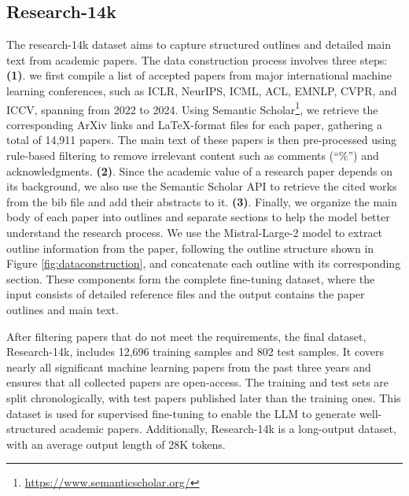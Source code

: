 \documentclass{article} %
\begin{document}
\subsection{Research-14k}

The research-14k dataset aims to capture structured outlines and detailed main text from academic papers. The data construction process involves three steps: \textbf{(1)}. we first compile a list of accepted papers from major international machine learning conferences, such as ICLR, NeurIPS, ICML, ACL, EMNLP, CVPR, and ICCV, spanning from 2022 to 2024. Using Semantic Scholar\footnote{\url{https://www.semanticscholar.org/}}, we retrieve the corresponding ArXiv links and LaTeX-format files for each paper, gathering a total of 14,911 papers. The main text of these papers is then pre-processed using rule-based filtering to remove irrelevant content such as comments (``$\%$'') and acknowledgments. \textbf{(2)}. Since the academic value of a research paper depends on its background, we also use the Semantic Scholar API to retrieve the cited works from the bib file and add their abstracts to it. \textbf{(3)}. Finally, we organize the main body of each paper into outlines and separate sections to help the model better understand the research process. We use the Mistral-Large-2 model \citep{jiang2023mistral} to extract outline information from the paper, following the outline structure shown in Figure \ref{fig:dataconstruction}, and concatenate each outline with its corresponding section. These components form the complete fine-tuning dataset, where the input consists of detailed reference files and the output contains the paper outlines and main text.


After filtering papers that do not meet the requirements, the final dataset, Research-14k, includes 12,696 training samples and 802 test samples. It covers nearly all significant machine learning papers from the past three years and ensures that all collected papers are open-access. The training and test sets are split chronologically, with test papers published later than the training ones. This dataset is used for supervised fine-tuning to enable the LLM to generate well-structured academic papers. Additionally, Research-14k is a long-output dataset, with an average output length of 28K tokens. 
\end{document}
